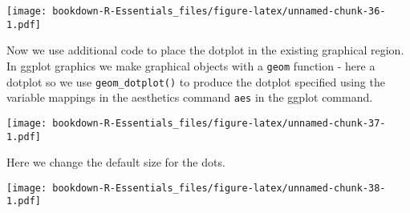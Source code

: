 \documentclass[]{book}
\newenvironment{Shaded}{\begin{snugshade}}{\end{snugshade}}
\newcommand{\KeywordTok}[1]{\textcolor[rgb]{0.13,0.29,0.53}{\textbf{#1}}}
\newcommand{\DataTypeTok}[1]{\textcolor[rgb]{0.13,0.29,0.53}{#1}}
\newcommand{\DecValTok}[1]{\textcolor[rgb]{0.00,0.00,0.81}{#1}}
\newcommand{\FloatTok}[1]{\textcolor[rgb]{0.00,0.00,0.81}{#1}}
\newcommand{\StringTok}[1]{\textcolor[rgb]{0.31,0.60,0.02}{#1}}
\newcommand{\CommentTok}[1]{\textcolor[rgb]{0.56,0.35,0.01}{\textit{#1}}}
\newcommand{\OperatorTok}[1]{\textcolor[rgb]{0.81,0.36,0.00}{\textbf{#1}}}
\newcommand{\NormalTok}[1]{#1}
\begin{document}
\texttt{[image: bookdown-R-Essentials\_files/figure-latex/unnamed-chunk-36-1.pdf]}

Now we use additional code to place the dotplot in the existing
graphical region. In ggplot graphics we make graphical objects with a
\texttt{geom} function - here a dotplot so we use
\texttt{geom\_dotplot()} to produce the dotplot specified using the
variable mappings in the aesthetics command \texttt{aes} in the ggplot
command.

\begin{Shaded}
\end{Shaded}

\texttt{[image: bookdown-R-Essentials\_files/figure-latex/unnamed-chunk-37-1.pdf]}

Here we change the default size for the dots.

\begin{Shaded}
\end{Shaded}

\texttt{[image: bookdown-R-Essentials\_files/figure-latex/unnamed-chunk-38-1.pdf]}
\end{document}
